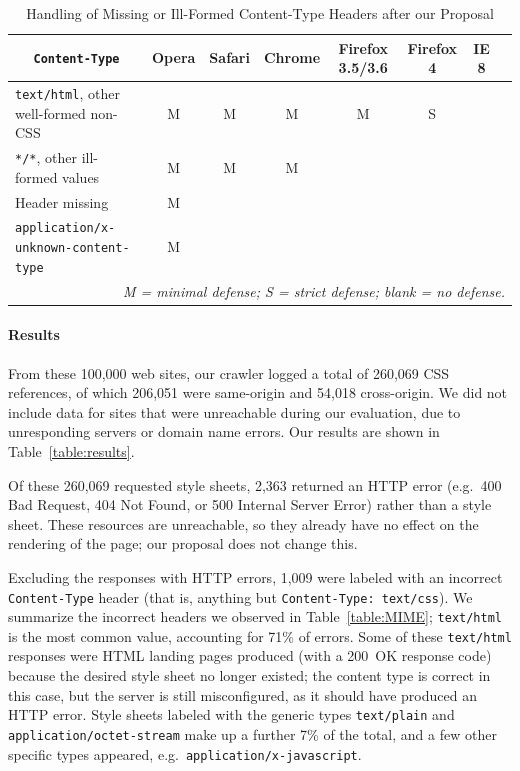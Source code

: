 \documentclass{sig-alternate}
\begin{document}
\begin{table}
\centering
\begin{tabular}{lccccccc}
\toprule
\multicolumn{1}{c}{\texttt{Content-Type}}
&Opera&Safari&Chrome&Firefox 3.5/3.6&Firefox 4&IE 8&\\
\midrule
\texttt{text/html},
other well-formed non-CSS                   & M & M & M & M & S &  & \\
\texttt{*/*}, other ill-formed values       & M & M & M &   &   &  & \\
Header missing                               & M &   &   &   &   &  & \\
\texttt{application/x-unknown-content-type} & M &   &   &   &   &  & \\
\bottomrule
\multicolumn{8}{r}{\vrule height10pt width0pt\relax\itshape
  M = minimal defense; S = strict defense; blank = no defense.}
\end{tabular}
\caption{Handling of Missing or Ill-Formed
  Content-Type Headers after our Proposal}\label{table:adoption}
\end{table}

\paragraph{Results}
From these 100,000 web sites, our crawler logged a total of 260,069
CSS references, of which 206,051 were same-origin and 54,018
cross-origin.  We did not include data for sites that were unreachable
during our evaluation, due to unresponding servers or domain name
errors. Our results are shown in Table~\ref{table:results}.

Of these 260,069 requested style sheets, 2,363 returned an HTTP error
(e.g.\ 400 Bad Request, 404 Not Found, or 500 Internal Server Error)
rather than a style sheet. These resources are unreachable, so they
already have no effect on the rendering of the page; our proposal does
not change this.

Excluding the responses with HTTP errors, 1,009 were labeled with an
incorrect \texttt{Content-Type} header (that is, anything but
\verb|Content-Type: text/css|).  We summarize the incorrect headers we
observed in Table~\ref{table:MIME}; \verb|text/html| is the most
common value, accounting for 71\% of errors.  Some of these
\verb|text/html| responses were HTML landing pages produced (with a
200~OK response code) because the desired style sheet no longer
existed; the content type is correct in this case, but the
server is still misconfigured, as it should have produced an HTTP
error.  Style sheets labeled with the generic types \verb|text/plain|
and \verb|application/octet-stream| make up a further 7\% of the
total, and a few other specific types appeared,
e.g.~\verb|application/x-javascript|.
\end{document}
